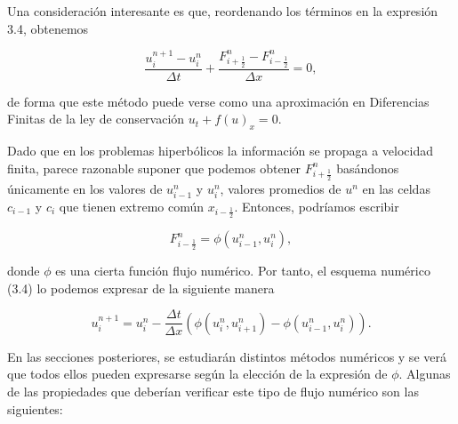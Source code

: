 Una consideración interesante es que, reordenando los términos en la
expresión 3.4, obtenemos

\begin{equation*}
    \frac{u^{n+1}_{i}-u^{n}_{i}}{\Delta t}+
    \frac{F^{n}_{i+\frac{1}{2}}-F^{n}_{i-\frac{1}{2}}}{\Delta x}=
    0,
\end{equation*}

de forma que este método puede verse como una aproximación en
Diferencias Finitas de la ley de conservación
$u_{t}+f\left(u\right)_{x}=0$.

Dado que en los problemas hiperbólicos la información se propaga a
velocidad finita, parece razonable suponer que podemos obtener
$F^{n}_{i+\frac{1}{2}}$ basándonos únicamente en los valores de
$u^{n}_{i-1}$ y $u^{n}_{i}$, valores promedios de $u^{n}$ en las
celdas $c_{i-1}$ y $c_{i}$ que tienen extremo común
$x_{i-\frac{1}{2}}$.
Entonces, podríamos escribir

\begin{equation*}
    F^{n}_{i-\frac{1}{2}}=
    \phi
    \left(
    u^{n}_{i-1},
    u^{n}_{i}
    \right),
\end{equation*}

donde $\phi$ es una cierta función flujo numérico.
Por tanto, el esquema numérico (3.4) lo podemos expresar de la
siguiente manera

\begin{equation*}
    u^{n+1}_{i}=
    u^{n}_{i}-
    \frac{\Delta t}{\Delta x}
    \left(
    \phi\left(u^{n}_{i},u^{n}_{i+1}\right)-
    \phi\left(u^{n}_{i-1},u^{n}_{i}\right)
    \right).
\end{equation*}

En las secciones posteriores, se estudiarán distintos métodos
numéricos y se verá que todos ellos pueden expresarse según la
elección de la expresión de $\phi$.
Algunas de las propiedades que deberían verificar este tipo de flujo
numérico son las siguientes:

